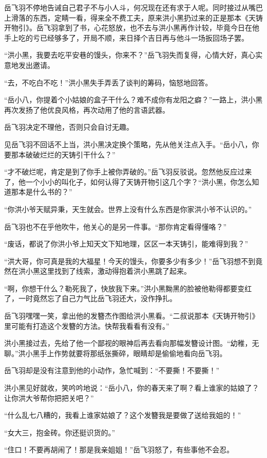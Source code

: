 岳飞羽不停地告诫自己君子不与小人斗，何况现在还有求于人呢。同时接过从嘴巴上滑落的东西，定睛一看，得来全不费工夫，原来洪小黑扔过来的正是那本《天铸开物引》。岳飞羽拿到了书，心花怒放，也不去与洪小黑再作计较，毕竟今日在他手上吃的亏已经够多了，开局不顺，来日择个吉日再与他斗一场扳回场子罢。

“洪小黑，我要去吃平安巷的馒头，你来不？”岳飞羽失而复得，心情大好，真心实意地发出邀请。

“去，不吃白不吃！”洪小黑失手弄丢了谈判的筹码，恼怒地回答。

“岳小八，你提着个小姑娘的盒子干什么？难不成你有龙阳之癖？”一路上，洪小黑再次发扬了他优良风格，再次动用了他的言语武器。

岳飞羽决定不理他，否则只会自讨无趣。

见岳飞羽不回话不上当，洪小黑决定换个策略，先从他关注点入手。“岳小八，你要那本破破烂烂的天铸引干什么？”

“才不破烂呢，肯定是到了你手上被你弄破的。”岳飞羽反驳说。忽然他反应过来了，他一个小小的叫化子，如何认得了天铸开物引这几个字？“洪小黑，你怎么知道那本是什么书的？”

“你洪小爷天赋异秉，天生就会。世界上没有什么东西是你家洪小爷不认识的。”

岳飞羽也不在乎他吹牛，他关心的是另一件事。“那你肯定看得懂咯？”

“废话，都说了你洪小爷上知天文下知地理，区区一本天铸引，能难得到我？”

“洪大哥，你可真是我的大福星！今天的馒头，你要多少有多少！”岳飞羽想不到竟然在洪小黑这里找到了线索，激动得抱着洪小黑跳了起来。

“啊，你想干什么？勒死我了，快放我下来。”洪小黑黝黑的脸被他勒得都要变红了，一时竟然忘了自己力气比岳飞羽还大，没作挣扎。

岳飞羽嘿嘿一笑，拿出他的发簪杰作图给洪小黑看。“二叔说那本《天铸开物引》里可能有打造这个发簪的方法。快帮我看看有没有。”

洪小黑接过去，先给了他一个鄙视的眼神后再去看向那幅发簪设计图。“幼稚，无聊。”洪小黑手上作势就要将那纸张撕碎，眼睛却是偷偷地看向岳飞羽。

岳飞羽却是没有注意到他的小动作，急忙喊到：“不要撕！不要撕！”

洪小黑见好就收，笑吟吟地说：“岳小八，你的春天来了啊？看上谁家的姑娘了？让你洪大爷帮你把把关吧？”

“什么乱七八糟的，我看上谁家姑娘了？这个发簪我是要做了送给我姐的！”

“女大三，抱金砖。你还挺识货的。”

“住口！不要再胡闹了！那是我亲姐姐！”岳飞羽怒了，有些事他不会忍。

